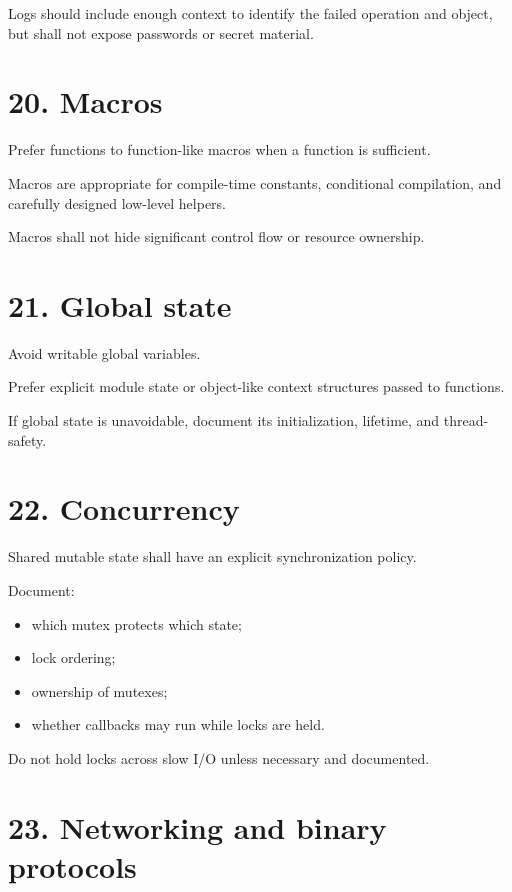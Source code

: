 \documentclass[11pt,a4paper]{article}
\begin{document}
Logs should include enough context to identify the failed operation and
object, but shall not expose passwords or secret material.

\section{20. Macros}\label{20-macros}

Prefer functions to function-like macros when a function is sufficient.

Macros are appropriate for compile-time constants, conditional
compilation, and carefully designed low-level helpers.

Macros shall not hide significant control flow or resource ownership.

\section{21. Global state}\label{21-global-state}

Avoid writable global variables.

Prefer explicit module state or object-like context structures passed to
functions.

If global state is unavoidable, document its initialization, lifetime,
and thread-safety.

\section{22. Concurrency}\label{22-concurrency}

Shared mutable state shall have an explicit synchronization policy.

Document:

\begin{itemize}
\tightlist
\item
  which mutex protects which state;
\item
  lock ordering;
\item
  ownership of mutexes;
\item
  whether callbacks may run while locks are held.
\end{itemize}

Do not hold locks across slow I/O unless necessary and documented.

\section{23. Networking and binary
protocols}\label{23-networking-and-binary-protocols}
\end{document}
